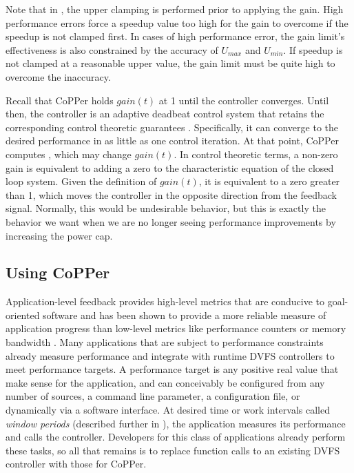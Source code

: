 Note that in , the upper clamping is performed prior to applying the gain.
High performance errors force a speedup value too high for the gain to overcome if the speedup is not clamped first.
In cases of high performance error, the gain limit's effectiveness is also constrained by the accuracy of $U_{max}$ and $U_{min}$.
If speedup is not clamped at a reasonable upper value, the gain limit must be quite high to overcome the inaccuracy.

Recall that CoPPer holds $gain(t)$ at 1 until the controller converges.
Until then, the controller is an adaptive deadbeat control system that retains the corresponding control theoretic guarantees \cite{ICSE2014}.
Specifically, it can converge to the desired performance in as little as one control iteration.
At that point, CoPPer computes , which may change $gain(t)$.
In control theoretic terms, a non-zero gain is equivalent to adding a zero to the characteristic equation of the closed loop system.
Given the definition of $gain(t)$, it is equivalent to a zero greater than 1, which moves the controller in the opposite direction from the feedback signal.
Normally, this would be undesirable behavior, but this is exactly the behavior we want when we are no longer seeing performance improvements by increasing the power cap.


\subsection{Using CoPPer}
\label{sec:copper-implementation}

Application-level feedback provides high-level metrics that are conducive to goal-oriented software and has been shown to provide a more reliable measure of application progress than low-level metrics like performance counters or memory bandwidth \cite{PTRADE}.
Many applications that are subject to performance constraints already measure performance and integrate with runtime DVFS controllers to meet performance targets.
A performance target is any positive real value that make sense for the application, and can conceivably be configured from any number of sources, \eg a command line parameter, a configuration file, or dynamically via a software interface.
At desired time or work intervals called \emph{window periods} (described further in ), the application measures its performance and calls the controller.
Developers for this class of applications already perform these tasks, so all that remains is to replace function calls to an existing DVFS controller with those for CoPPer.

